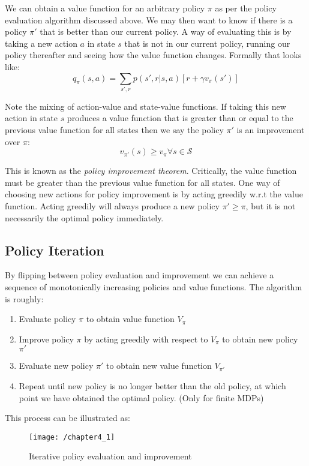 We can obtain a value function for an arbitrary policy $\pi$ as per the policy evaluation algorithm discussed above. We may then want to know if there is a policy $\pi'$ that is better than our current policy. A way of evaluating this is by taking a new action $a$ in state $s$ that is not in our current policy, running our policy thereafter and seeing how the value function changes. Formally that looks like:
\begin{equation}
q_\pi(s, a) = \sum_{s',r} p(s', r | s, a) \left[r + \gamma v_\pi(s')\right]
\end{equation}

Note the mixing of action-value and state-value functions. If taking this new action in state $s$ produces a value function that is greater than or equal to the previous value function for all states then we say the policy $\pi'$ is an improvement over $\pi$:
\begin{equation}
v_{\pi'}(s) \geq v_\pi \forall s \in \mathcal{S}
\end{equation}

This is known as the \textit{policy improvement theorem}. Critically, the value function must be greater than the previous value function for all states. One way of choosing new actions for policy improvement is by acting greedily w.r.t the value function. Acting greedily will always produce a new policy $\pi' \geq \pi$, but it is not necessarily the optimal policy immediately.

\subsection{Policy Iteration}
By flipping between policy evaluation and improvement we can achieve a sequence of monotonically increasing policies and value functions. The algorithm is roughly:
\begin{enumerate}
\item Evaluate policy \(\pi\) to obtain value function \(V_\pi\)
\item Improve policy \(\pi\) by acting greedily with respect to \(V_\pi\) to obtain new policy \(\pi'\)
\item Evaluate new policy \(\pi'\) to obtain new value function \(V_{\pi'}\)
\item Repeat until new policy is no longer better than the old policy, at which point we have obtained the optimal policy. (Only for finite MDPs)
\end{enumerate}
This process can be illustrated as:
\begin{figure}[h!]
	\centering
	\texttt{[image: /chapter4\_1]}
	\caption{Iterative policy evaluation and improvement}
	\label{fig:policy evaluation}
\end{figure}

